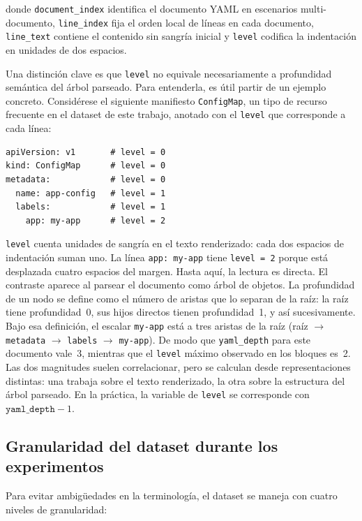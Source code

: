 donde \texttt{document\_index} identifica el documento YAML en escenarios multi-documento, \texttt{line\_index} fija el orden local de líneas en cada
documento, \texttt{line\_text} contiene el contenido sin sangría inicial y \texttt{level} codifica la indentación en unidades de dos espacios.

Una distinción clave es que \texttt{level} no equivale necesariamente a profundidad semántica del árbol parseado. Para entenderla, es útil partir de
un ejemplo concreto. Considérese el siguiente manifiesto \texttt{ConfigMap}, un tipo de recurso frecuente en el dataset de este trabajo, anotado con
el \texttt{level} que corresponde a cada línea:

\begin{lstlisting}[style=yamlblock]
apiVersion: v1       # level = 0
kind: ConfigMap      # level = 0
metadata:            # level = 0
  name: app-config   # level = 1
  labels:            # level = 1
    app: my-app      # level = 2
\end{lstlisting}

\texttt{level} cuenta unidades de sangría en el texto renderizado: cada dos espacios de indentación suman uno. La línea \texttt{app: my-app} tiene
\texttt{level = 2} porque está desplazada cuatro espacios del margen. Hasta aquí, la lectura es directa. El contraste aparece al parsear el documento
como árbol de objetos. La profundidad de un nodo se define como el número de aristas que lo separan de la raíz: la raíz tiene profundidad~0, sus
hijos directos tienen profundidad~1, y así sucesivamente. Bajo esa definición, el escalar \texttt{my-app} está a tres aristas de la raíz
(raíz $\to$ \texttt{metadata} $\to$ \texttt{labels} $\to$ \texttt{my-app}). De modo que \texttt{yaml\_depth} para este documento
vale~3, mientras que el \texttt{level} máximo observado en los bloques es~2. Las dos magnitudes suelen correlacionar, pero se calculan desde
representaciones distintas: una trabaja sobre el texto renderizado, la otra sobre la estructura del árbol parseado. En la práctica, la variable de 
\texttt{level} se corresponde con $\texttt{yaml\_depth} - 1$.   

\subsection{Granularidad del dataset durante los experimentos}
\label{sec:ch4_granularity}

Para evitar ambigüedades en la terminología, el dataset se maneja con cuatro niveles de granularidad:

